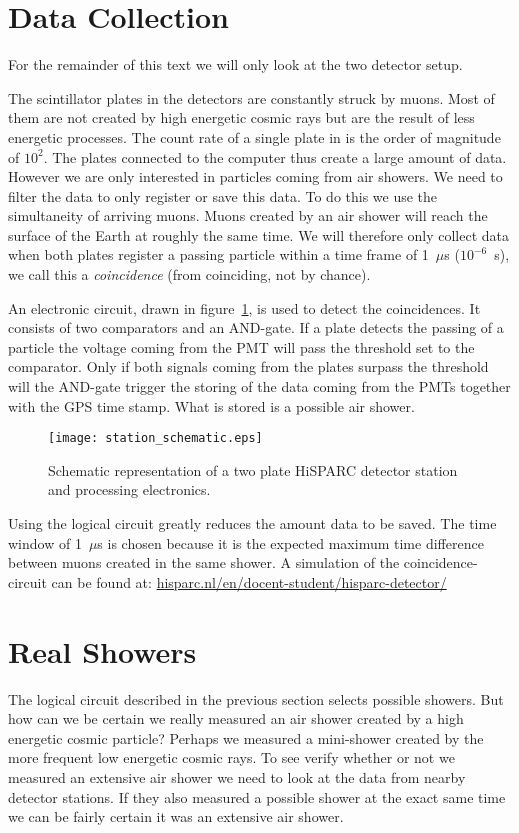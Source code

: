 \section{Data Collection}
For the remainder of this text we will only look at the two detector setup.

The scintillator plates in the detectors are constantly struck by muons. Most of them are not created by high energetic cosmic rays but are the result of less energetic processes. The count rate of a single plate in is the order of magnitude of $10^2$. The plates connected to the computer thus create a large amount of data. However we are only interested in particles coming from air showers. We need to filter the data to only register or save this data. To do this we use the simultaneity of arriving muons. Muons created by an air shower will reach the surface of the Earth at roughly the same time. We will therefore only collect data when both plates register a passing particle within a time frame of 1~$\mu$s ($10^{-6}$~s), we call this a \emph{coincidence} (from coinciding, not by chance). 

An electronic circuit, drawn in figure~\ref{fig:station_schematic}, is used to detect the coincidences. It consists of two comparators and an AND-gate. If a plate detects the passing of a particle the voltage coming from the PMT will pass the threshold set to the comparator. Only if both signals coming from the plates surpass the threshold will the AND-gate trigger the storing of the data coming from the PMTs together with the GPS time stamp. What is stored is a possible air shower. 

\begin{figure}\begin{center}
\texttt{[image: station\_schematic.eps]}%
\caption{Schematic representation of a two plate HiSPARC detector station and processing electronics. }\label{fig:station_schematic}
\end{center}\end{figure}

Using the logical circuit greatly reduces the amount data to be saved. The time window of 1~$\mu$s is chosen because it is the expected maximum time difference between muons created in the same shower. A simulation of the coincidence-circuit can be found at:
\url{hisparc.nl/en/docent-student/hisparc-detector/}

\section{Real Showers}
The logical circuit described in the previous section selects possible showers. But how can we be certain we really measured an air shower created by a high energetic cosmic particle? Perhaps we measured a mini-shower created by the more frequent low energetic cosmic rays. To see verify whether or not we measured an extensive air shower we need to look at the data from nearby detector stations. If they also measured a possible shower at the exact same time we can be fairly certain it was an extensive air shower.

